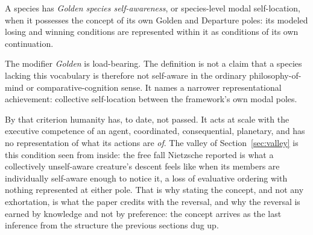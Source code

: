 \begin{definition}\label{def:selfaware}
A species has \emph{Golden species self-awareness}, or species-level
modal self-location, when it possesses the concept of its own Golden and
Departure poles: its modeled losing and winning conditions are
represented within it as conditions of its own continuation.
\end{definition}

\noindent The modifier \emph{Golden} is load-bearing. The definition is
not a claim that a species lacking this vocabulary is therefore not
self-aware in the ordinary philosophy-of-mind or comparative-cognition
sense. It names a narrower representational achievement: collective
self-location between the framework's own modal poles.

\noindent By that criterion humanity has, to date, not passed. It acts
at scale with the executive competence of an agent, coordinated,
consequential, planetary, and has no representation of what its actions
are \emph{of}. The valley of Section~\ref{sec:valley} is this condition
seen from inside: the free fall Nietzsche reported is what a
collectively unself-aware creature's descent feels like when its members
are individually self-aware enough to notice it, a loss of evaluative
ordering with nothing represented at either pole. That is why stating
the concept, and not any exhortation, is what the paper credits with the
reversal, and why the reversal is earned by knowledge and not by
preference: the concept arrives as the last inference from the
structure the previous sections dug up.

